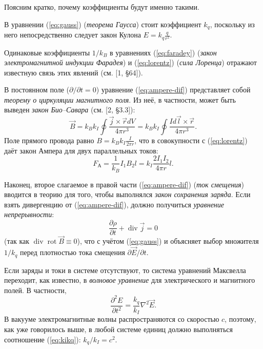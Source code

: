 Поясним кратко, почему коэффициенты будут именно такими.

В уравнении (\ref{eq:gauss}) (\emph{теорема Гаусса}) стоит коэффициент $k_q$,
поскольку из него непосредственно следует закон Кулона $E=k_{q}\frac{q}{r^{2}}$.

Одинаковые коэффициенты $1/k_{B}$ в уравнениях (\ref{eq:faradey})
(\emph{закон электромагнитной индукции Фарадея}) и (\ref{eq:lorentz})
(\emph{сила Лоренца}) отражают известную связь этих явлений
(см. [1, \S 64]).

В постоянном поле ($\partial/\partial t=0$) уравнение (\ref{eq:ampere-dif})
представляет собой \emph{теорему о циркуляции магнитного поля}. Из
неё, в частности, может быть выведен \emph{закон Био--Савара}
 (см. [2, \S 3.3]):
\[
\vec{B}=k_{B}k_{I}\oint\frac{\vec{j}\times\vec{r}dV}{4\pi r^{3}}=k_{B}k_{I}\oint\frac{Id\vec{l}\times\vec{r}}{4\pi r^{3}}.
\]
Поле прямого провода равно $B=k_{B}k_{I}\frac{I}{2\pi r}$, что в
совокупности с (\ref{eq:lorentz}) даёт закон Ампера для двух параллельных
токов:
\[
F_{\text{А}}=\frac{1}{k_{B}}I_{1}B_{2}l=k_{I}\frac{2I_{1}I_{2}}{4\pi r}l.
\]

Наконец, второе слагаемое в правой части (\ref{eq:ampere-dif}) (\emph{ток
смещения}) вводится в теорию для того, чтобы выполнялся
\emph{закон сохранения заряда}. Если взять дивергенцию от (\ref{eq:ampere-dif}),
должно получиться \emph{уравнение непрерывности}:
\[
\frac{\partial\rho}{\partial t}+\mathop{\mathrm{div}}\vec{j}=0
\]
(так как $\mathop{\mathrm{div}}\mathop{\mathrm{rot}}\vec{B}\equiv 0$),
что с учётом (\ref{eq:gauss}) и объясняет выбор множителя~$1/k_{q}$
перед плотностью тока смещения $\partial{\vec E}/\partial{t}$.

Если заряды и токи в системе отсутствуют, то система уравнений Максвелла
переходит, как известно, в \emph{волновое уравнение} для электрического
и магнитного полей. В частности,
\[
\frac{\partial^{2}E}{\partial t^{2}}=\frac{k_{q}}{k_{I}}\nabla^{2}\vec{E}.
\]
В вакууме электромагнитные волны распространяются со скоростью $c$,
поэтому, как уже говорилось выше, в любой системе единиц должно выполняться
соотношение (\ref{eq:kikq}): $k_{q}/k_{I}=c^{2}$.

